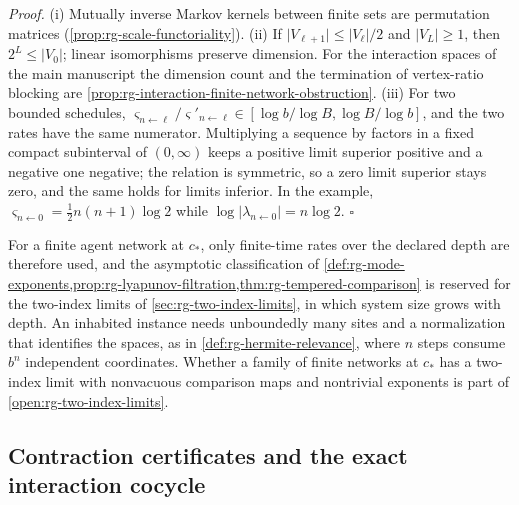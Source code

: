 \noindent\emph{Proof.}
(i) Mutually inverse Markov kernels between finite sets are permutation
matrices (\cref{prop:rg-scale-functoriality}). (ii) If
\(\lvert V_{\ell+1}\rvert\leq\lvert V_\ell\rvert/2\) and
\(\lvert V_L\rvert\geq1\), then \(2^L\leq\lvert V_0\rvert\); linear isomorphisms
preserve dimension. For the interaction spaces of the main manuscript the
dimension count and the termination of vertex-ratio blocking are
\cref{prop:rg-interaction-finite-network-obstruction}. (iii) For two bounded
schedules,
\(\varsigma_{n\leftarrow\ell}/\varsigma'_{n\leftarrow\ell}\in
[\log b/\log B,\log B/\log b]\), and the two rates have the same numerator.
Multiplying a sequence by factors in a fixed compact subinterval of
\((0,\infty)\) keeps a positive limit superior positive and a negative one
negative; the relation is symmetric, so a zero limit superior stays zero, and
the same holds for limits inferior. In the example,
\(\varsigma_{n\leftarrow0}=\tfrac12n(n+1)\log2\) while
\(\log\lvert\lambda_{n\leftarrow0}\rvert=n\log2\). \(\square\)

For a finite agent network at \(c_*\), only finite-time rates over the
declared depth are therefore used, and the asymptotic classification of
\cref{def:rg-mode-exponents,prop:rg-lyapunov-filtration,thm:rg-tempered-comparison}
is reserved for the two-index limits of \cref{sec:rg-two-index-limits}, in
which system size grows with depth. An inhabited instance needs unboundedly
many sites and a normalization that identifies the spaces, as in
\cref{def:rg-hermite-relevance}, where \(n\) steps consume \(b^n\) independent
coordinates. Whether a family of finite networks at \(c_*\) has a two-index
limit with nonvacuous comparison maps and nontrivial exponents is part of
\cref{open:rg-two-index-limits}.

\subsection{Contraction certificates and the exact interaction cocycle}

